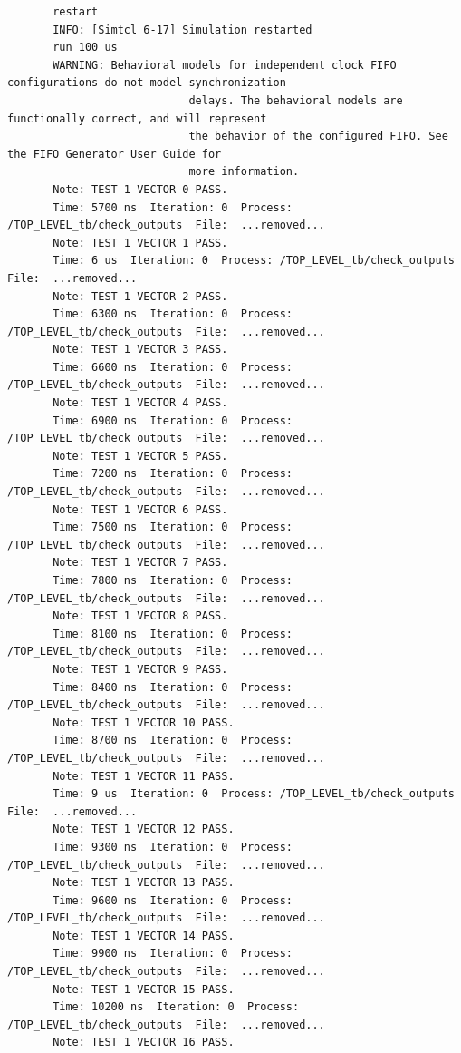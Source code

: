 \documentclass[11pt]{report}
\begin{document}
\begin{verbatim}
       restart
       INFO: [Simtcl 6-17] Simulation restarted
       run 100 us
       WARNING: Behavioral models for independent clock FIFO configurations do not model synchronization
                            delays. The behavioral models are functionally correct, and will represent
                            the behavior of the configured FIFO. See the FIFO Generator User Guide for
                            more information.
       Note: TEST 1 VECTOR 0 PASS.
       Time: 5700 ns  Iteration: 0  Process: /TOP_LEVEL_tb/check_outputs  File:  ...removed...
       Note: TEST 1 VECTOR 1 PASS.
       Time: 6 us  Iteration: 0  Process: /TOP_LEVEL_tb/check_outputs  File:  ...removed...
       Note: TEST 1 VECTOR 2 PASS.
       Time: 6300 ns  Iteration: 0  Process: /TOP_LEVEL_tb/check_outputs  File:  ...removed...
       Note: TEST 1 VECTOR 3 PASS.
       Time: 6600 ns  Iteration: 0  Process: /TOP_LEVEL_tb/check_outputs  File:  ...removed...
       Note: TEST 1 VECTOR 4 PASS.
       Time: 6900 ns  Iteration: 0  Process: /TOP_LEVEL_tb/check_outputs  File:  ...removed...
       Note: TEST 1 VECTOR 5 PASS.
       Time: 7200 ns  Iteration: 0  Process: /TOP_LEVEL_tb/check_outputs  File:  ...removed...
       Note: TEST 1 VECTOR 6 PASS.
       Time: 7500 ns  Iteration: 0  Process: /TOP_LEVEL_tb/check_outputs  File:  ...removed...
       Note: TEST 1 VECTOR 7 PASS.
       Time: 7800 ns  Iteration: 0  Process: /TOP_LEVEL_tb/check_outputs  File:  ...removed...
       Note: TEST 1 VECTOR 8 PASS.
       Time: 8100 ns  Iteration: 0  Process: /TOP_LEVEL_tb/check_outputs  File:  ...removed...
       Note: TEST 1 VECTOR 9 PASS.
       Time: 8400 ns  Iteration: 0  Process: /TOP_LEVEL_tb/check_outputs  File:  ...removed...
       Note: TEST 1 VECTOR 10 PASS.
       Time: 8700 ns  Iteration: 0  Process: /TOP_LEVEL_tb/check_outputs  File:  ...removed...
       Note: TEST 1 VECTOR 11 PASS.
       Time: 9 us  Iteration: 0  Process: /TOP_LEVEL_tb/check_outputs  File:  ...removed...
       Note: TEST 1 VECTOR 12 PASS.
       Time: 9300 ns  Iteration: 0  Process: /TOP_LEVEL_tb/check_outputs  File:  ...removed...
       Note: TEST 1 VECTOR 13 PASS.
       Time: 9600 ns  Iteration: 0  Process: /TOP_LEVEL_tb/check_outputs  File:  ...removed...
       Note: TEST 1 VECTOR 14 PASS.
       Time: 9900 ns  Iteration: 0  Process: /TOP_LEVEL_tb/check_outputs  File:  ...removed...
       Note: TEST 1 VECTOR 15 PASS.
       Time: 10200 ns  Iteration: 0  Process: /TOP_LEVEL_tb/check_outputs  File:  ...removed...
       Note: TEST 1 VECTOR 16 PASS.

\end{verbatim}
\end{document}
